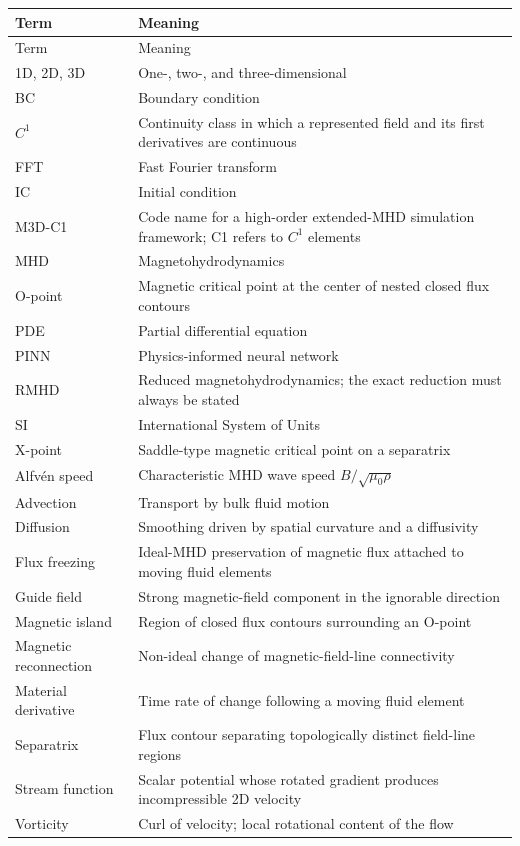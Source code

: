\documentclass[11pt]{article}
\begin{document}
\begin{longtable}{p{}p{}}
\toprule
Term & Meaning \\
\midrule
\endfirsthead
\toprule
Term & Meaning \\
\midrule
\endhead
1D, 2D, 3D & One-, two-, and three-dimensional \\
BC & Boundary condition \\
$C^1$ & Continuity class in which a represented field and its first derivatives are continuous \\
FFT & Fast Fourier transform \\
IC & Initial condition \\
M3D-C1 & Code name for a high-order extended-MHD simulation framework; C1 refers to $C^1$ elements \\
MHD & Magnetohydrodynamics \\
O-point & Magnetic critical point at the center of nested closed flux contours \\
PDE & Partial differential equation \\
PINN & Physics-informed neural network \\
RMHD & Reduced magnetohydrodynamics; the exact reduction must always be stated \\
SI & International System of Units \\
X-point & Saddle-type magnetic critical point on a separatrix \\
Alfv\'en speed & Characteristic MHD wave speed $B/\sqrt{\mu_0\rho}$ \\
Advection & Transport by bulk fluid motion \\
Diffusion & Smoothing driven by spatial curvature and a diffusivity \\
Flux freezing & Ideal-MHD preservation of magnetic flux attached to moving fluid elements \\
Guide field & Strong magnetic-field component in the ignorable direction \\
Magnetic island & Region of closed flux contours surrounding an O-point \\
Magnetic reconnection & Non-ideal change of magnetic-field-line connectivity \\
Material derivative & Time rate of change following a moving fluid element \\
Separatrix & Flux contour separating topologically distinct field-line regions \\
Stream function & Scalar potential whose rotated gradient produces incompressible 2D velocity \\
Vorticity & Curl of velocity; local rotational content of the flow \\
\bottomrule
\end{longtable}
\end{document}
